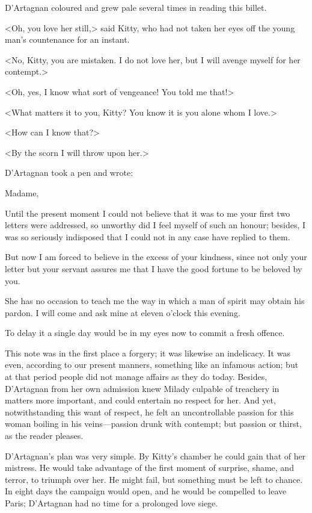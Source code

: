 D'Artagnan coloured and grew pale several times in reading this billet. 

<Oh, you love her still,> said Kitty, who had not taken her eyes off the young man's countenance for an instant. 

<No, Kitty, you are mistaken. I do not love her, but I will avenge myself for her contempt.> 

<Oh, yes, I know what sort of vengeance! You told me that!> 

<What matters it to you, Kitty? You know it is you alone whom I love.> 

<How can I know that?> 

<By the scorn I will throw upon her.> 

D'Artagnan took a pen and wrote: 

\begin{mail}{}{Madame,}
	
Until the present moment I could not believe that it was to me your first two letters were addressed, so unworthy did I feel myself of such an honour; besides, I was so seriously indisposed that I could not in any case have replied to them.

But now I am forced to believe in the excess of your kindness, since not only your letter but your servant assures me that I have the good fortune to be beloved by you.

She has no occasion to teach me the way in which a man of spirit may obtain his pardon. I will come and ask mine at eleven o'clock this evening.

To delay it a single day would be in my eyes now to commit a fresh offence.

\end{mail}

This note was in the first place a forgery; it was likewise an indelicacy. It was even, according to our present manners, something like an infamous action; but at that period people did not manage affairs as they do today. Besides, D'Artagnan from her own admission knew Milady culpable of treachery in matters more important, and could entertain no respect for her. And yet, notwithstanding this want of respect, he felt an uncontrollable passion for this woman boiling in his veins—passion drunk with contempt; but passion or thirst, as the reader pleases. 

D'Artagnan's plan was very simple. By Kitty's chamber he could gain that of her mistress. He would take advantage of the first moment of surprise, shame, and terror, to triumph over her. He might fail, but something must be left to chance. In eight days the campaign would open, and he would be compelled to leave Paris; D'Artagnan had no time for a prolonged love siege. 


